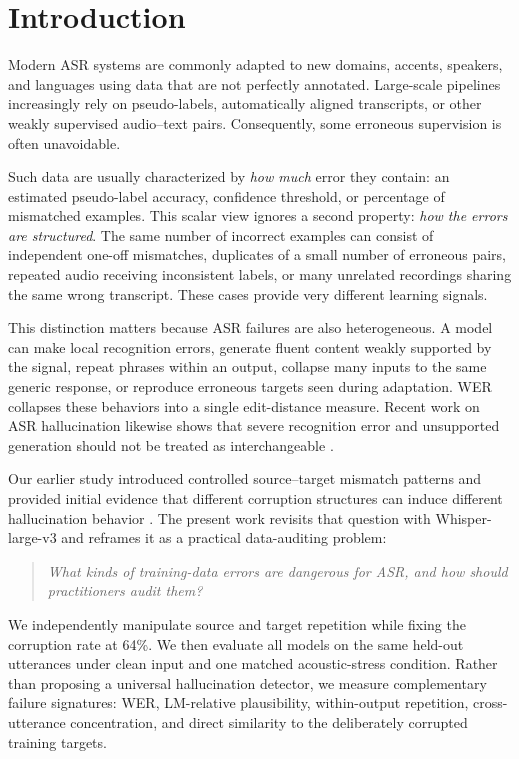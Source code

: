 \documentclass[conference]{IEEEtran}
\begin{document}
\section{Introduction}
Modern ASR systems are commonly adapted to new domains, accents, speakers, and
languages using data that are not perfectly annotated. Large-scale pipelines
increasingly rely on pseudo-labels, automatically aligned transcripts, or other
weakly supervised audio--text pairs. Consequently, some erroneous supervision
is often unavoidable.

Such data are usually characterized by \emph{how much} error they contain: an
estimated pseudo-label accuracy, confidence threshold, or percentage of
mismatched examples. This scalar view ignores a second property: \emph{how the
errors are structured}. The same number of incorrect examples can consist of
independent one-off mismatches, duplicates of a small number of erroneous
pairs, repeated audio receiving inconsistent labels, or many unrelated
recordings sharing the same wrong transcript. These cases provide very
different learning signals.

This distinction matters because ASR failures are also heterogeneous. A model
can make local recognition errors, generate fluent content weakly supported by
the signal, repeat phrases within an output, collapse many inputs to the same
generic response, or reproduce erroneous targets seen during adaptation. WER
collapses these behaviors into a single edit-distance measure. Recent work on
ASR hallucination likewise shows that severe recognition error and unsupported
generation should not be treated as interchangeable
\cite{koenecke2024careless,atwany2025lost,baranski2025investigation,sridhar25_interspeech,imai-etal-2025-evaluating,baranski2026halas}.

Our earlier study introduced controlled source--target mismatch patterns and
provided initial evidence that different corruption structures can induce
different hallucination behavior \cite{frieske2024hallucinations}. The present
work revisits that question with Whisper-large-v3 and reframes it as a practical
data-auditing problem:

\begin{quote}
\emph{What kinds of training-data errors are dangerous for ASR, and how should
practitioners audit them?}
\end{quote}

We independently manipulate source and target repetition while fixing the
corruption rate at 64\%. We then evaluate all models on the same held-out
utterances under clean input and one matched acoustic-stress condition. Rather
than proposing a universal hallucination detector, we measure complementary
failure signatures: WER, LM-relative plausibility, within-output repetition,
cross-utterance concentration, and direct similarity to the deliberately
corrupted training targets.
\end{document}
